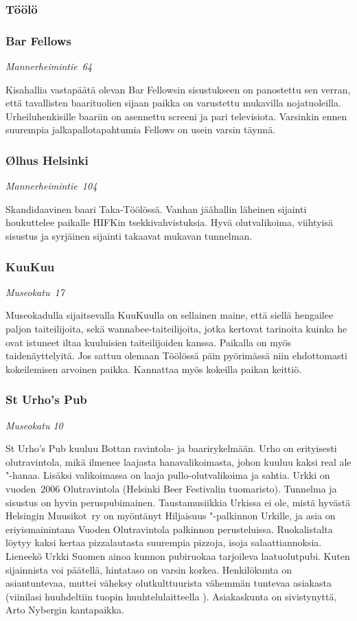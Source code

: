 \documentclass[../ala_hataile.tex]{subfiles}
\begin{document}
\subsubsection*{Töölö}
\subsubsection*{Bar Fellows}
\textit{Mannerheimintie~64}

Kisahallia vastapäätä olevan Bar Fellowsin
sisustukseen on panostettu sen
verran, että tavallisten baarituolien sijaan
paikka on varustettu mukavilla nojatuoleilla.
Urheiluhenkisille baariin on asennettu screeni ja pari televisiota. Varsinkin ennen
suurempia jalkapallotapahtumia Fellows on usein varsin täynnä.
\subsubsection*{Ølhus Helsinki}
\textit{Mannerheimintie~104}

Skandidaavinen baari Taka-Töölössä.
Vanhan jäähallin läheinen sijainti houkuttelee
paikalle HIFKin tsekkivahvistuksia.
Hyvä olutvalikoima, viihtyisä sisustus ja
syrjäinen sijainti takaavat mukavan tunnelman.
\subsubsection*{KuuKuu}
\textit{Museokatu~17}

Museokadulla sijaitsevalla KuuKuulla
on sellainen maine, että siellä hengailee paljon
taiteilijoita, sekä wannabee-taiteilijoita,
jotka kertovat tarinoita kuinka he ovat istuneet
iltaa kuuluisien taiteilijoiden kanssa.
Paikalla on myös taidenäyttelyitä. Jos sattuu
olemaan Töölössä päin pyörimässä
niin ehdottomasti kokeilemisen arvoinen paikka. Kannattaa myös kokeilla paikan keittiö.
\subsubsection*{St Urho's Pub}
\textit{Museokatu 10}

St Urho's Pub kuuluu Bottan ravintola-
ja baarirykelmään. Urho on erityisesti
olutravintola,
mikä ilmenee laajasta hanavalikoimasta,
johon kuuluu kaksi real ale
"-hanaa. Lisäksi valikoimassa on laaja pullo-olutvalikoima
ja sahtia. Urkki on vuoden~2006 Olutravintola (Helsinki Beer Festivalin
tuomaristo). Tunnelma ja sisustus on
hyvin peruspubimainen. Taustamusiikkia
Urkissa ei ole, mistä hyvästä Helsingin
Muusikot~ry on myöntänyt Hiljaisuus "-palkinnon
Urkille, ja asia on eriyismainintana
Vuoden Olutravintola palkinnon perusteluissa.
Ruokalistalta löytyy kaksi kertaa
pizzalautasta suurempia pizzoja, isoja salaattiannoksia.
Lieneekö Urkki Suomen ainoa kunnon pubiruokaa tarjoileva laatuolutpubi.
Kuten sijainnista voi päätellä,
hintataso on varsin korkea. Henkilökunta
on asiantuntevaa, muttei väheksy olutkulttuurista
vähemmän tuntevaa asiakasta (viinilasi
huuhdeltiin tuopin huuhtelulaitteella \smiley). Asiakaskunta on sivistynyttä, Arto Nybergin
kantapaikka.
\end{document}
